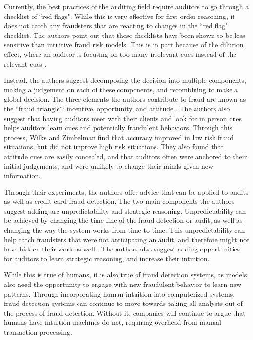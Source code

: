 \documentclass[midd]{thesis}
\begin{document}
Currently, the best practices of the auditing field require auditors to go through a checklist of ``red flags". While this is very effective for first order reasoning, it does not catch any fraudsters that are reacting to changes in the ``red flag" checklist. The authors point out that these checklists have been shown to be less sensitive than intuitive fraud risk models. This is in part because of the dilution effect, where an auditor is focusing on too many irrelevant cues instead of the relevant cues \cite{Wilks2004}. 

Instead, the authors suggest decomposing the decision into multiple components, making a judgement on each of these components, and recombining to make a global decision. The three elements the authors contribute to fraud are known as the ``fraud triangle": incentive, opportunity, and attitude \cite{Wilks2004}. The authors also suggest that having auditors meet with their clients and look for in person cues helps auditors learn cues and potentially fraudulent behaviors. Through this process, Wilks and Zimbelman find that accuracy improved in low risk fraud situations, but did not improve high risk situations. They also found that attitude cues are easily concealed, and that auditors often were anchored to their initial judgements, and were unlikely to change their minds given new information.

Through their experiments, the authors offer advice that can be applied to audits as well as credit card fraud detection. The two main components the authors suggest adding are unpredictability and strategic reasoning. Unpredictability can be achieved by changing the time line of the fraud detection or audit, as well as changing the way the system works from time to time. This unpredictability can help catch fraudsters that were not anticipating an audit, and therefore might not have hidden their work as well \cite{Wilks2004}. The authors also suggest adding opportunities for auditors to learn strategic reasoning, and increase their intuition. 

While this is true of humans, it is also true of fraud detection systems, as models also need the opportunity to engage with new fraudulent behavior to learn new patterns. Through incorporating human intuition into computerized systems, fraud detection systems can continue to move towards taking all analysts out of the process of fraud detection. Without it, companies will continue to argue that humans have intuition machines do not, requiring overhead from manual transaction processing. 
\end{document}
